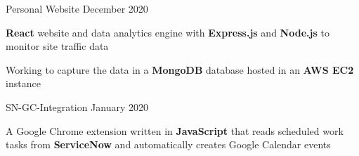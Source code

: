 \documentclass[]{awesome-cv}
\begin{document}

\begin{cventries}
    \cventry
	{}
	{Personal Website}
	{December 2020}
	{}
	{\begin{cvitems}
		\vspace{-4mm}
		\item {
		\textbf{React} 
		{website and data analytics engine with \textbf{Express.js} and \textbf{Node.js} to monitor site traffic data}}
		\item {Working to capture the data in a \textbf{MongoDB} database hosted in an \textbf{AWS EC2} instance}
		\end{cvitems}}
	\cventry
	{}
	{SN-GC-Integration}
	{January 2020}
	{}
	{\begin{cvitems}
		\vspace{-4mm}
		\item {A Google Chrome extension written in \textbf{JavaScript} that reads scheduled work tasks from \textbf{ServiceNow} and automatically creates Google Calendar events}
		\end{cvitems}}
\end{cventries}
\end{document}
